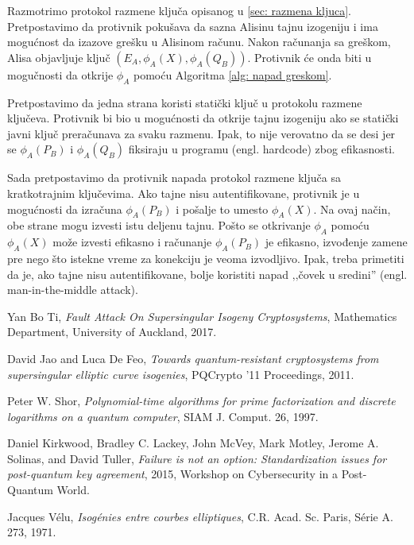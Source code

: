 \documentclass[a4paper]{article}
\begin{document}
Razmotrimo protokol razmene ključa opisanog u \ref{sec: razmena kljuca}. Pretpostavimo da protivnik pokušava da sazna Alisinu tajnu izogeniju i ima mogućnost da izazove grešku u Alisinom računu. Nakon računanja sa greškom, Alisa objavljuje ključ $(E_A, \phi_A(X), \phi_A(Q_B))$. Protivnik će onda biti u mogučnosti da otkrije $\phi_A$ pomoću Algoritma \ref{alg: napad greskom}.


Pretpostavimo da jedna strana koristi statički ključ u protokolu razmene ključeva. Protivnik bi bio u mogućnosti da otkrije tajnu izogeniju ako se statički javni ključ preračunava za svaku razmenu. Ipak, to nije verovatno da se desi jer se $\phi_A(P_B)$ i $\phi_A(Q_B)$ fiksiraju u programu (engl. hardcode) zbog efikasnosti. 

Sada pretpostavimo da protivnik napada protokol razmene ključa sa kratkotrajnim ključevima. Ako tajne nisu autentifikovane, protivnik je u mogućnosti da izračuna $\phi_A(P_B)$ i pošalje to umesto $\phi_A(X)$. Na ovaj način, obe strane mogu izvesti istu deljenu tajnu. Pošto se otkrivanje $\phi_A$ pomoću  $\phi_A(X)$ može izvesti efikasno i računanje  $\phi_A(P_B)$ je efikasno, izvođenje zamene pre nego što istekne vreme za konekciju je veoma izvodljivo. Ipak, treba primetiti da je, ako tajne nisu autentifikovane, bolje koristiti napad ‚‚čovek u sredini'' (engl. man-in-the-middle attack).


\appendix
\begin{thebibliography}{11}
	
	Yan Bo Ti,
	\textit{Fault Attack On Supersingular Isogeny Cryptosystems},
	Mathematics Department, University of Auckland,
	2017.
	
	David Jao and Luca De Feo, 
	\textit{Towards quantum-resistant cryptosystems from supersingular elliptic curve
	isogenies}, 
	PQCrypto '11 Proceedings, 
	2011.	
	
	Peter W. Shor, 
	\textit{Polynomial-time algorithms for prime factorization and discrete logarithms on a quantum
	computer}, 
	SIAM J. Comput. 26, 
	1997.
	
	Daniel Kirkwood, Bradley C. Lackey, John McVey, Mark Motley, Jerome A. Solinas, and David Tuller,
	\textit{Failure is not an option: Standardization issues for post-quantum key agreement}, 
	2015, 
	Workshop on Cybersecurity in a Post-Quantum World.
	
	
	Jacques V\' elu, 
	\textit{Isog\' enies entre courbes elliptiques}, 
	C.R. Acad. Sc. Paris, S\' erie A. 273,
	1971.
\end{thebibliography}

\end{document}
